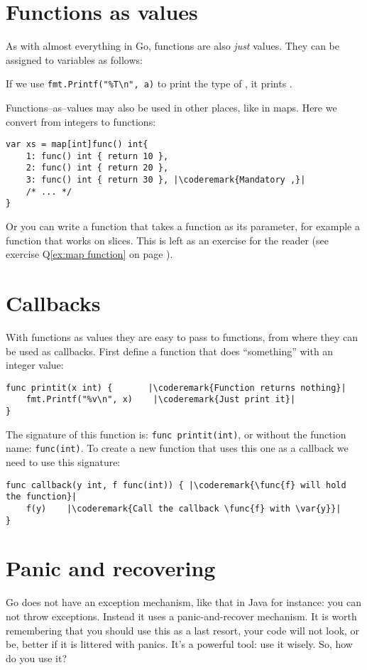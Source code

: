 \section{Functions as values}
\label{sec:functions as values}
As with almost everything in Go, functions are also \emph{just} values.
They can be assigned to variables as follows:

If we use \lstinline{fmt.Printf("%T\n", a)} to print the type of
, it prints .

Functions--as--values may also be used in other places, like in maps.
Here we convert from integers to functions:
\begin{lstlisting}[caption=Functions as values in maps]
var xs = map[int]func() int{
    1: func() int { return 10 },
    2: func() int { return 20 },
    3: func() int { return 30 }, |\coderemark{Mandatory ,}|
    /* ... */
}
\end{lstlisting}
Or you can write a function that takes a function as its parameter, for
example a  function that works on  slices. This is
left as an exercise for the reader (see exercise Q\ref{ex:map function}
on page \pageref{ex:map function}).

\section{Callbacks}
\label{sec:callbacks}
With functions as values they are easy to pass to functions, from where
they can be used as callbacks. First define a function that
does ``something'' with an integer value:
\begin{lstlisting}
func printit(x int) {       |\coderemark{Function returns nothing}|
    fmt.Printf("%v\n", x)    |\coderemark{Just print it}|
}
\end{lstlisting}
The signature of this function is: \lstinline{func printit(int)}, or
without the function name: \mbox{\lstinline{func(int)}}. To create a new function
that uses this one as a callback we need to use this signature:
\begin{lstlisting}
func callback(y int, f func(int)) { |\coderemark{\func{f} will hold the function}|
    f(y)    |\coderemark{Call the callback \func{f} with \var{y}}|
}
\end{lstlisting}

\section{Panic and recovering}
\label{sec:panic}
Go does not have an exception mechanism, like that in Java for instance: you can not throw exceptions.
Instead it uses a panic-and-recover mechanism. It is worth remembering that you should use this as
a last resort, your code will not look, or be, better if it is littered with panics. It's a powerful tool:
use it wisely. So, how do you use it?

